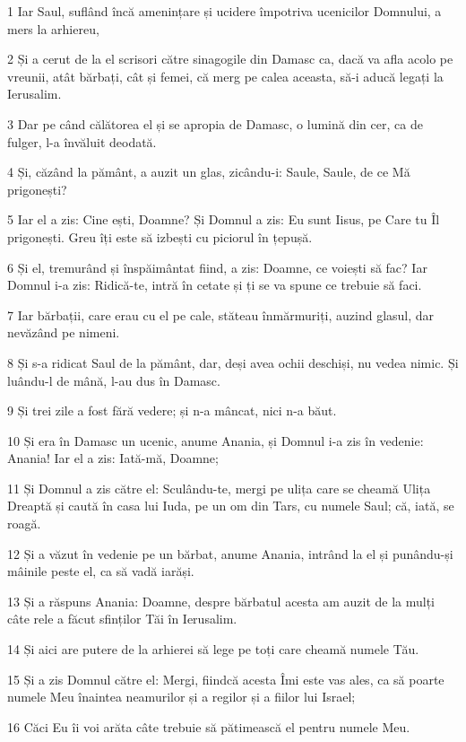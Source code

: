 \par 1 Iar Saul, suflând încă amenințare și ucidere împotriva ucenicilor Domnului, a mers la arhiereu,
\par 2 Și a cerut de la el scrisori către sinagogile din Damasc ca, dacă va afla acolo pe vreunii, atât bărbați, cât și femei, că merg pe calea aceasta, să-i aducă legați la Ierusalim.
\par 3 Dar pe când călătorea el și se apropia de Damasc, o lumină din cer, ca de fulger, l-a învăluit deodată.
\par 4 Și, căzând la pământ, a auzit un glas, zicându-i: Saule, Saule, de ce Mă prigonești?
\par 5 Iar el a zis: Cine ești, Doamne? Și Domnul a zis: Eu sunt Iisus, pe Care tu Îl prigonești. Greu îți este să izbești cu piciorul în țepușă.
\par 6 Și el, tremurând și înspăimântat fiind, a zis: Doamne, ce voiești să fac? Iar Domnul i-a zis: Ridică-te, intră în cetate și ți se va spune ce trebuie să faci.
\par 7 Iar bărbații, care erau cu el pe cale, stăteau înmărmuriți, auzind glasul, dar nevăzând pe nimeni.
\par 8 Și s-a ridicat Saul de la pământ, dar, deși avea ochii deschiși, nu vedea nimic. Și luându-l de mână, l-au dus în Damasc.
\par 9 Și trei zile a fost fără vedere; și n-a mâncat, nici n-a băut.
\par 10 Și era în Damasc un ucenic, anume Anania, și Domnul i-a zis în vedenie: Anania! Iar el a zis: Iată-mă, Doamne;
\par 11 Și Domnul a zis către el: Sculându-te, mergi pe ulița care se cheamă Ulița Dreaptă și caută în casa lui Iuda, pe un om din Tars, cu numele Saul; că, iată, se roagă.
\par 12 Și a văzut în vedenie pe un bărbat, anume Anania, intrând la el și punându-și mâinile peste el, ca să vadă iarăși.
\par 13 Și a răspuns Anania: Doamne, despre bărbatul acesta am auzit de la mulți câte rele a făcut sfinților Tăi în Ierusalim.
\par 14 Și aici are putere de la arhierei să lege pe toți care cheamă numele Tău.
\par 15 Și a zis Domnul către el: Mergi, fiindcă acesta Îmi este vas ales, ca să poarte numele Meu înaintea neamurilor și a regilor și a fiilor lui Israel;
\par 16 Căci Eu îi voi arăta câte trebuie să pătimească el pentru numele Meu.

